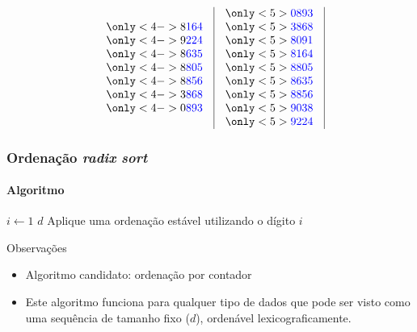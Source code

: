 \documentclass{beamer}
\begin{document}
\begin{frame}
$$\begin{array}{c|c|c|c|c}
\begin{array}{c}
    \only<4->{8\assert{164}} \\
    \only<4->{9\assert{224}} \\
    \only<4->{8\assert{635}} \\
    \only<4->{8\assert{805}} \\
    \only<4->{8\assert{856}} \\
    \only<4->{3\assert{868}} \\
    \only<4->{0\assert{893}}
  \end{array}
  &
  \begin{array}{c}
    \only<5>{\assert{0893}} \\
    \only<5>{\assert{3868}} \\
    \only<5>{\assert{8091}} \\
    \only<5>{\assert{8164}} \\
    \only<5>{\assert{8805}} \\
    \only<5>{\assert{8635}} \\
    \only<5>{\assert{8856}} \\
    \only<5>{\assert{9038}} \\
    \only<5>{\assert{9224}}
  \end{array}
  \end{array}
$$

\end{frame}

\begin{frame}
  \frametitle{Ordenação \textit{radix sort\/}}
  \framesubtitle{Algoritmo}

  \begin{codebox}
    \li \For $i \gets 1$ \To $d$
    \li \Do Aplique uma ordenação estável utilizando o dígito $i$
    \zi \End
  \end{codebox}
  \pause
  Observações
  \begin{itemize}
    \item Algoritmo candidato: ordenação por contador
    \item Este algoritmo funciona para qualquer tipo de dados que pode ser visto
      como uma sequência de tamanho fixo ($d$), ordenável
      \alert{lexicograficamente}.
  \end{itemize}
\end{frame}
\end{document}
